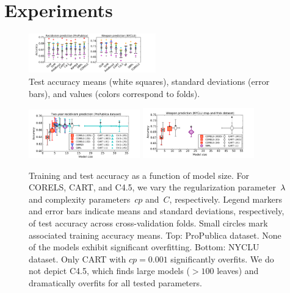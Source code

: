\section{Experiments}
\label{sec:experiments}

\begin{figure}[t!]
\begin{center}
\includegraphics[trim={12mm, 11mm, 25mm, 5mm},
width=0.49\textwidth]{figs/compare-compas-weapon.pdf}
\end{center}
\caption{Test accuracy means (white squares),
standard deviations (error bars),
and values (colors correspond to folds).
}
\label{fig:comparison}
\end{figure}

\begin{figure}[t!]
\begin{center}
\includegraphics[trim={12mm, 0mm, 24mm, 5mm}, width=0.43\textwidth]{figs/compas-sparsity-training.pdf}
\includegraphics[trim={12mm, 12mm, 24mm, 1mm}, width=0.43\textwidth]{figs/frisk-sparsity-training.pdf}
\end{center}
\caption{Training and test accuracy as a function of model size.
%
For CORELS, CART, and C4.5, we vary the regularization parameter~${\lambda}$
and complexity parameters~$cp$ and~$C$, respectively.
%
Legend markers and error bars indicate means and standard deviations,
respectively, of test accuracy across cross-validation folds.
%
Small circles mark associated training accuracy means.
%
Top:  %
ProPublica dataset.
%
None of the models exhibit significant overfitting.
%
Bottom:  %
NYCLU dataset.
%
Only CART with ${cp = 0.001}$ significantly overfits.
%
We do not depict C4.5, which finds large models (${>100}$ leaves)
and dramatically overfits for all tested parameters.
}
\label{fig:sparsity}
\end{figure}

